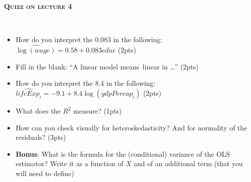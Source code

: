 \documentclass[a4, 12pt]{report}
\begin{document}



\begin{center}
	\Huge \textbf{\textsc{Quizz on lecture 4}}
\end{center}
\normalsize
		~\\
		
	\begin{itemize}
		\item How do you interpret the 0.083 in the following: $\widehat{\log(wage)} = 0.58 + 0.083 educ$ (2pts)
			\vspace{3cm}
		\item  Fill in the blank: “A linear model means linear in …” (2pts)
			\vspace{1.5cm}
		\item  How do you interpret the 8.4 in the following: $\widehat{lifeExp_i} = -9.1 + 8.4 \log(gdpPercap_i)$ (2pts)
			\vspace{3cm}
		\item What does the $R^2$ measure? (1pts)
			\vspace{1.5cm}
		\item How can you check visually for heteroskedasticity? And for normality of the residuals? (3pts)
			\vspace{3.5cm}
		\item \textbf{Bonus}: What is the formula for the (conditional) variance of the OLS estimator? Write it as a function of $X$ and of an additional term (that you will need to define)
			\vspace{3cm}
	\end{itemize}
		
		
				
		

				
				
				
\end{document}
